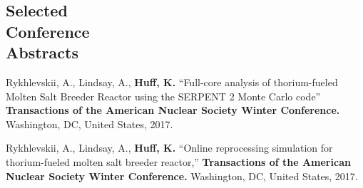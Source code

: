 \documentclass[margin,line]{resume}
\begin{document}
\begin{resume}
    \section{\mysidestyle Selected\\Conference\\Abstracts}
    \begin{bibenum}
    \item Rykhlevskii, A., Lindsay, A., \textbf{Huff, K.} ``Full-core analysis of thorium-fueled Molten Salt Breeder Reactor using the SERPENT 2 Monte Carlo code'' 
            \textbf{Transactions of the American Nuclear Society Winter Conference.} 
            Washington, DC, United States, 2017.
    \item Rykhlevskii, A., Lindsay, A., \textbf{Huff, K.} ``Online reprocessing simulation for thorium-fueled molten salt breeder reactor,'' 
            \textbf{Transactions of the American Nuclear Society Winter Conference.} 
            Washington, DC, United States, 2017.

\end{bibenum}
\end{resume}
\end{document}
